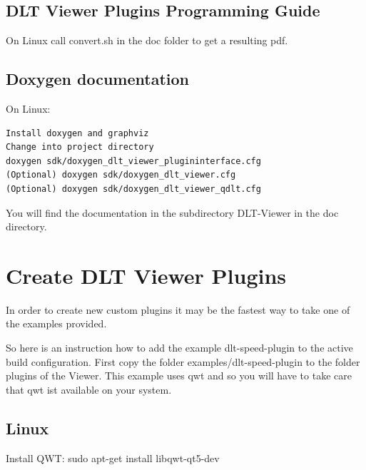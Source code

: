 \documentclass[a4paper,11pt]{article}
\begin{document}
\subsection{DLT Viewer Plugins Programming Guide}

On Linux call convert.sh in the doc folder to get a resulting pdf.

\subsection{Doxygen documentation}

On Linux:

\begin{verbatim}
Install doxygen and graphviz
Change into project directory
doxygen sdk/doxygen_dlt_viewer_plugininterface.cfg
(Optional) doxygen sdk/doxygen_dlt_viewer.cfg
(Optional) doxygen sdk/doxygen_dlt_viewer_qdlt.cfg
\end{verbatim}
You will find the documentation in the subdirectory DLT-Viewer in the doc directory.


\pagebreak

\section{Create DLT Viewer Plugins}

In order to create new custom plugins it may be the fastest way to take one of the examples provided.

So here is an instruction how to add the example dlt-speed-plugin to the active build configuration.
First copy the folder examples/dlt-speed-plugin to the folder plugins of the Viewer.
This example uses qwt and so you will have to take care that qwt ist available on your system.


\subsection{Linux}

Install QWT: sudo apt-get install libqwt-qt5-dev
\end{document}
